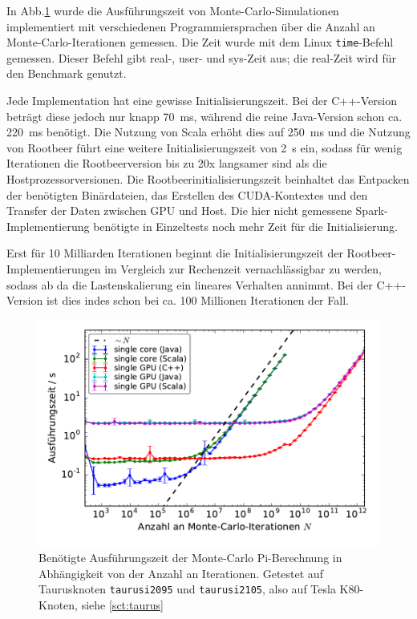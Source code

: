 In Abb.\ref{fig:montepiworkloadscaling} wurde die Ausführungszeit von Monte-Carlo-Simulationen implementiert mit verschiedenen Programmiersprachen über die Anzahl an Monte-Carlo-Iterationen gemessen.
Die Zeit wurde mit dem Linux \lstinline!time!-Befehl gemessen. Dieser Befehl gibt real-, user- und sys-Zeit aus; die real-Zeit wird für den Benchmark genutzt.

Jede Implementation hat eine gewisse Initialisierungszeit. Bei der C++-Version beträgt diese jedoch nur knapp \SI{70}{\milli\second}, während die reine Java-Version schon ca. \SI{220}{\milli\second} benötigt.
Die Nutzung von Scala erhöht dies auf \SI{250}{\milli\second} und die Nutzung von Rootbeer führt eine weitere Initialisierungszeit von \SI{2}{\second} ein, sodass für wenig Iterationen die Rootbeerversion bis zu 20x langsamer sind als die Hostprozessorversionen.
Die Rootbeerinitialisierungszeit beinhaltet das Entpacken der benötigten Binärdateien, das Erstellen des CUDA-Kontextes und den Transfer der Daten zwischen GPU und Host.
Die hier nicht gemessene Spark-Implementierung benötigte in Einzeltests noch mehr Zeit für die Initialisierung.

Erst für 10 Milliarden Iterationen beginnt die Initialisierungszeit der Rootbeer-Implementierungen im Vergleich zur Rechenzeit vernachlässigbar zu werden, sodass ab da die Lastenskalierung ein lineares Verhalten annimmt.
Bei der C++-Version ist dies indes schon bei ca. 100 Millionen Iterationen der Fall.
\begin{figure}
	\centering
	\begin{minipage}{0.7\linewidth}
		\includegraphics[width=\linewidth]{../MontePi/benchmark/benchmarks-workload-scaling.pdf}
	\end{minipage}
	\caption{Benötigte Ausführungszeit der Monte-Carlo Pi-Berechnung in Abhängigkeit von der Anzahl an Iterationen. Getestet auf Taurusknoten \lstinline!taurusi2095! und \lstinline!taurusi2105!, also auf Tesla K80-Knoten, siehe \autoref{sct:taurus}}
	\label{fig:montepiworkloadscaling}
\end{figure}

